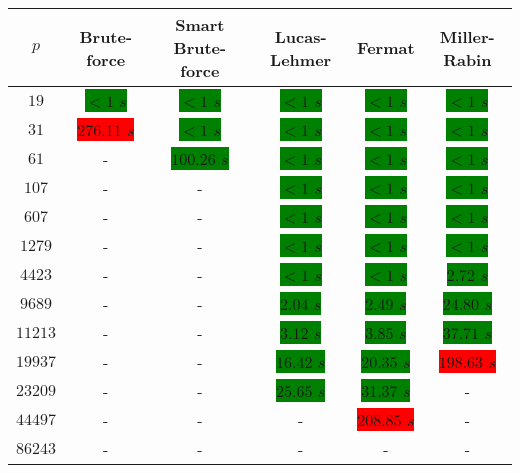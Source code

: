 \documentclass[main.tex]{subfiles}
\begin{document}
\begin{table}[ht!]
  \begin{tabular}{||c | c c c c c||}
    \hline
    $p$ & Brute-force & Smart Brute-force & Lucas-Lehmer & Fermat & Miller-Rabin  \\ [0.5ex] 
    \hline\hline
    $19$ & \colorbox{green}{$<1$ $s$} & \colorbox{green}{$<1$ $s$} & \colorbox{green}{$<1$ $s$} & \colorbox{green}{$<1$ $s$} & \colorbox{green}{$<1$ $s$}\\
    $31$ & \colorbox{red}{$276.11$ $s$} & \colorbox{green}{$<1$ $s$} & \colorbox{green}{$<1$ $s$} & \colorbox{green}{$<1$ $s$} & \colorbox{green}{$<1$ $s$}\\
    $61$ & - & \colorbox{green}{$100.26$ $s$} & \colorbox{green}{$<1$ $s$} & \colorbox{green}{$<1$ $s$} & \colorbox{green}{$<1$ $s$}\\
    $107$ & - & - & \colorbox{green}{$<1$ $s$} & \colorbox{green}{$<1$ $s$} & \colorbox{green}{$<1$ $s$}\\
    $607$ & - & - & \colorbox{green}{$<1$ $s$} & \colorbox{green}{$<1$ $s$} & \colorbox{green}{$<1$ $s$}\\
    $1279$ & - & - & \colorbox{green}{$<1$ $s$} & \colorbox{green}{$<1$ $s$} & \colorbox{green}{$<1$ $s$}\\
    $4423$ & - & - & \colorbox{green}{$<1$ $s$} & \colorbox{green}{$<1$ $s$} & \colorbox{green}{$2.72$ $s$}\\
    $9689$ & - & - & \colorbox{green}{$2.04$ $s$} & \colorbox{green}{$2.49$ $s$} & \colorbox{green}{$24.80$ $s$}\\
    $11213$ & - & - & \colorbox{green}{$3.12$ $s$} & \colorbox{green}{$3.85$ $s$} & \colorbox{green}{$37.71$ $s$}\\
    $19937$ & - & - & \colorbox{green}{$16.42$ $s$} & \colorbox{green}{$20.35$ $s$} &  \colorbox{red}{$198.63$ $s$}\\
    $23209$ & - & - & \colorbox{green}{$25.65$ $s$} & \colorbox{green}{$31.37$ $s$} & -\\ 
    $44497$ & - & - & - &  \colorbox{red}{$208.85$ $s$} & -\\ 
    $86243$ & - & - & - & - & -\\  [1ex] 
    \hline
  \end{tabular}
\end{table}
\end{document}
